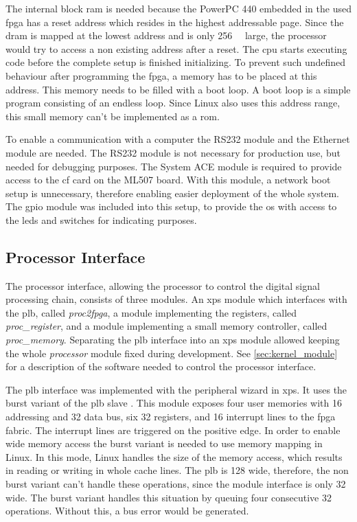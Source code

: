 \documentclass[12pt,a4paper,parskip=full,abstract=true,BCOR=12mm]{scrreprt}
\def\device#1{\mbox{\textit{#1}}}
\begin{document}
The internal block \gls{ram} is needed because the PowerPC 440 embedded
in the used \gls{fpga} has a reset address which resides in the highest
addressable page\cite{ppc}. Since the \gls{dram} is mapped at the lowest address
and is only \SI{256}{\mebi\byte} large\cite{ml507}, the processor would try to access
a non existing address after a reset. The \gls{cpu} starts
executing code before the complete setup is finished initializing. To prevent such undefined
behaviour after programming the \gls{fpga}, a memory has to be placed at
this address. This memory needs to be filled with a boot loop. A boot
loop is a simple program consisting of an endless loop. Since Linux
also uses this address range, this small memory can't be implemented
as a \gls{rom}.

To enable a communication with a computer the RS232 module and the Ethernet
module are needed. The RS232 module is not necessary for production use,
but needed for debugging purposes. The System ACE module is required to
provide access to the \gls{cf} card on the ML507 board. With this module,
a network boot setup is unnecessary, therefore enabling easier deployment
of the whole system. The \gls{gpio} module was included into this setup,
to provide the \gls{os} with access to the \glspl{led} and switches for
indicating purposes.


\subsection{Processor Interface}
\label{sec:processor_interface}

The processor interface, allowing the processor to control the digital
signal processing chain, consists of three modules. An \gls{xps} module which
interfaces with the \gls{plb}, called \device{proc2fpga}, a module
implementing the registers, called \device{proc\_register}, and a module
implementing a small memory controller, called \device{proc\_memory}. Separating
the \gls{plb} interface into an \gls{xps} module allowed keeping the whole
\device{processor} module fixed during development. See \cref{sec:kernel_module}
for a description of the software needed to control the processor interface.

The \gls{plb} interface was implemented with the peripheral wizard in \gls{xps}.
It uses the burst variant of the \gls{plb} slave \cite{slave_burst}. This module
exposes four user memories with \SI{16}{\bit} addressing and \SI{32}{\bit} data
bus, six \SI{32}{\bit} registers, and 16 interrupt lines to the \gls{fpga} fabric.
The interrupt lines are triggered on the positive edge. In order to enable wide
memory access the burst variant is needed to use memory mapping in
Linux. In this mode, Linux handles the
size of the memory access, which results in reading or writing in whole
cache lines. The \gls{plb} is \SI{128}{\bit} wide, therefore, the non burst variant
can't handle these operations, since the module interface is only \SI{32}{\bit}
wide. The burst variant handles this situation by queuing four consecutive
\SI{32}{\bit} operations. Without this, a bus error would be generated.
\end{document}
